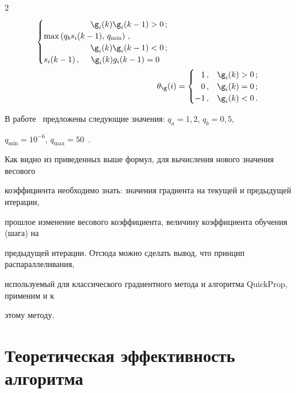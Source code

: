 \begin{multicols}{2}
\begin{align*}
\begin{cases}
\hspace*{20mm} \g_i(k)\g_i(k-1)>0\,;\\


\max \left( q_b s_i(k-1),\,q_{\min}\right)\,, \\


\hspace*{20mm} \g_i(k)\g_i(k-1)<0\,;\\


s_i(k-1)\,, \quad \hspace{1mm}\g_i(k) g_i(k-1)=0


\end{cases}




\\


\theta_{\g}(i) &=


\begin{cases}


\hphantom{-}1\,, & \g_i(k)>0\,;\\


\hphantom{-}0\,, & \g_i(k)=0\,;\\


-1\,, & \g_i(k)<0\,.


\end{cases}




\end{align*}


В работе~\cite{4kr} предложены следующие значения: $q_a=1{,}2$, $q_b=0{,}5$,


$q_{\min} =10^{-6}$, $q_{\max}=50$~\cite{13kr}.





 Как видно из приведенных выше формул, для вычисления нового значения весового


коэффициента необходимо знать: значения градиента на текущей и предыдущей итерации,


прошлое изменение весового коэффициента, величину коэффициента обучения (шага) на


предыдущей итерации. Отсюда можно сделать вывод, что принцип распараллеливания,


используемый для классического градиентного метода и алгоритма QuickProp, применим и к


этому методу.





\section{Теоретическая эффективность алгоритма}






\end{multicols}
